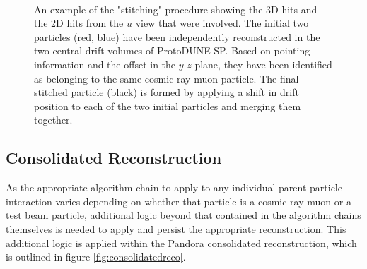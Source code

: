 \begin{figure}
\centering
{} \\
\caption{An example of the "stitching" procedure showing \protect{} the 3D hits and \protect{} the 2D hits from the $u$ view that were involved.  The initial two particles (red, blue) have been independently reconstructed in the two central drift volumes of ProtoDUNE-SP.  Based on pointing information and the offset in the $y$-$z$ plane, they have been identified as belonging to the same cosmic-ray muon particle.  The final stitched particle (black) is formed by applying a shift in drift position to each of the two initial particles and merging them together.}
\label{fig:stitching}
\end{figure}


\subsection{Consolidated Reconstruction}
\label{sec:consolidatedreco}
As the appropriate algorithm chain to apply to any individual parent particle interaction varies depending on whether that particle is a cosmic-ray muon or a test beam particle, additional logic beyond that contained in the algorithm chains themselves is needed to apply and persist the appropriate reconstruction. This additional logic is applied within the Pandora consolidated reconstruction, which is outlined in figure \ref{fig:consolidatedreco}.

